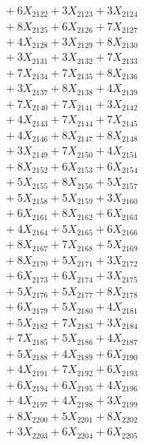 \documentclass[a4paper,10pt]{article}
\begin{document}
{\begin{align}
&\;  + 6 X_{2122} + 3 X_{2123} + 3 X_{2124} \\[0.3ex]
&\;  + 8 X_{2125} + 6 X_{2126} + 7 X_{2127} \\[0.3ex]
&\;  + 4 X_{2128} + 3 X_{2129} + 8 X_{2130} \\[0.3ex]
&\;  + 3 X_{2131} + 3 X_{2132} + 7 X_{2133} \\[0.3ex]
&\;  + 7 X_{2134} + 7 X_{2135} + 8 X_{2136} \\[0.3ex]
&\;  + 3 X_{2137} + 8 X_{2138} + 4 X_{2139} \\[0.5ex]\allowbreak
&\;  + 7 X_{2140} + 7 X_{2141} + 3 X_{2142} \\[0.3ex]
&\;  + 4 X_{2143} + 7 X_{2144} + 7 X_{2145} \\[0.3ex]
&\;  + 4 X_{2146} + 8 X_{2147} + 8 X_{2148} \\[0.3ex]
&\;  + 3 X_{2149} + 7 X_{2150} + 4 X_{2151} \\[0.3ex]
&\;  + 8 X_{2152} + 6 X_{2153} + 6 X_{2154} \\[0.3ex]
&\;  + 5 X_{2155} + 8 X_{2156} + 5 X_{2157} \\[0.3ex]
&\;  + 5 X_{2158} + 5 X_{2159} + 3 X_{2160} \\[0.3ex]
&\;  + 6 X_{2161} + 8 X_{2162} + 6 X_{2163} \\[0.3ex]
&\;  + 4 X_{2164} + 5 X_{2165} + 6 X_{2166} \\[0.3ex]
&\;  + 8 X_{2167} + 7 X_{2168} + 5 X_{2169} \\[0.5ex]\allowbreak
&\;  + 8 X_{2170} + 5 X_{2171} + 3 X_{2172} \\[0.3ex]
&\;  + 6 X_{2173} + 6 X_{2174} + 3 X_{2175} \\[0.3ex]
&\;  + 5 X_{2176} + 5 X_{2177} + 8 X_{2178} \\[0.3ex]
&\;  + 6 X_{2179} + 5 X_{2180} + 4 X_{2181} \\[0.3ex]
&\;  + 5 X_{2182} + 7 X_{2183} + 3 X_{2184} \\[0.3ex]
&\;  + 7 X_{2185} + 5 X_{2186} + 4 X_{2187} \\[0.3ex]
&\;  + 5 X_{2188} + 4 X_{2189} + 6 X_{2190} \\[0.3ex]
&\;  + 4 X_{2191} + 7 X_{2192} + 6 X_{2193} \\[0.3ex]
&\;  + 6 X_{2194} + 6 X_{2195} + 4 X_{2196} \\[0.3ex]
&\;  + 4 X_{2197} + 4 X_{2198} + 3 X_{2199} \\[0.5ex]\allowbreak
&\;  + 8 X_{2200} + 5 X_{2201} + 8 X_{2202} \\[0.3ex]
&\;  + 3 X_{2203} + 6 X_{2204} + 6 X_{2205} \\[0.3ex]

\end{align}}
\end{document}
